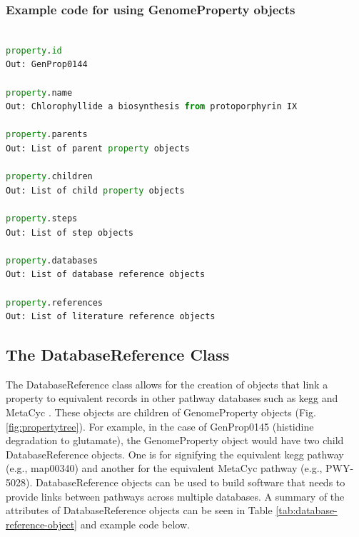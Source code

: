 \subsubsection{Example code for using GenomeProperty objects}

\begin{lstlisting}[language=Python]

property.id
Out: GenProp0144
	
property.name
Out: Chlorophyllide a biosynthesis from protoporphyrin IX

property.parents
Out: List of parent property objects

property.children	
Out: List of child property objects

property.steps
Out: List of step objects		
	
property.databases
Out: List of database reference objects

property.references
Out: List of literature reference objects

\end{lstlisting}

\subsection{The DatabaseReference Class}

The DatabaseReference class allows for the creation of objects that link a property to equivalent records in other pathway databases such as \gls{kegg} \cite{kanehisa2000kegg} and MetaCyc \cite{karp2002metacyc}. These objects are children of GenomeProperty objects (Fig. \ref{fig:propertytree}). For example, in the case of GenProp0145 (histidine degradation to glutamate), the GenomeProperty object would have two child DatabaseReference objects. One is for signifying the equivalent \gls{kegg} pathway (e.g., map00340) and another for the equivalent MetaCyc pathway (e.g., PWY-5028). DatabaseReference objects can be used to build software that needs to provide links between pathways across multiple databases. A summary of the attributes of DatabaseReference objects can be seen in Table \ref{tab:database-reference-object} and example code below.


